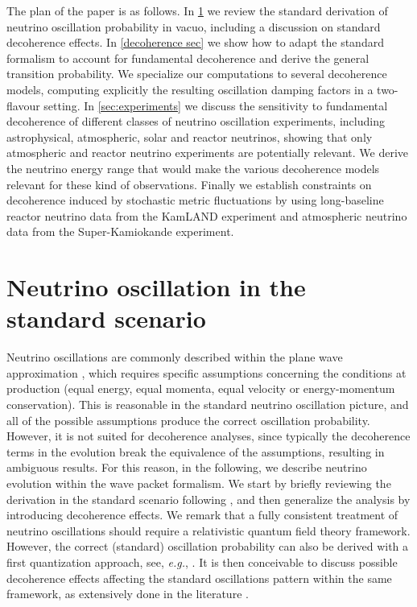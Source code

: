 \documentclass[11pt]{article}
\begin{document}
The plan of the paper is as follows. In \cref{standard oscillations section} we review the standard derivation of neutrino oscillation probability in vacuo, including a discussion on standard decoherence effects. In \cref{decoherence sec} we show how to adapt the standard formalism to account for fundamental decoherence and derive the general transition probability. We specialize our computations to several decoherence models, computing explicitly the resulting oscillation damping factors in a two-flavour setting. In \cref{sec:experiments}
we discuss the sensitivity to fundamental decoherence of different classes of neutrino oscillation experiments, including astrophysical, atmospheric, solar and reactor neutrinos, showing that only atmospheric and reactor neutrino experiments are potentially relevant. We derive the neutrino energy range that would make the various decoherence models relevant for these kind of observations. Finally we establish constraints on decoherence induced by stochastic metric fluctuations by using long-baseline reactor neutrino data from the KamLAND experiment and atmospheric neutrino data from the Super-Kamiokande experiment.




\section{Neutrino oscillation in the standard scenario}\label{standard oscillations section}

Neutrino oscillations are commonly described within the plane wave approximation \cite{Akhmedov:2009rb}, which requires specific assumptions concerning the conditions at production (equal energy, equal momenta, equal velocity or energy-momentum conservation). This is reasonable in the standard neutrino oscillation picture, and all of the possible assumptions produce the correct oscillation probability. However, it is not suited for decoherence analyses, since typically the decoherence terms in the evolution break the equivalence of the assumptions, resulting in ambiguous results. For this reason, in the following, we describe neutrino evolution within the wave packet formalism. We start by briefly reviewing the derivation in the standard scenario following \cite{Akhmedov:2009rb}, and then generalize the analysis by introducing decoherence effects. We remark that a fully consistent treatment of neutrino oscillations should require a relativistic quantum field theory framework. However, the correct (standard) oscillation probability can also be derived with a first quantization approach, see, \emph{e.g.}, \cite{Akhmedov:2009rb}. It is then conceivable to discuss possible decoherence effects affecting the standard oscillations pattern within the same framework, as extensively done in the literature \cite{Christian:2004xb,Banerjee:2022slh,Mavromatos:2007hv,Mavromatos:2004sz,Barenboim:2004wu,Christian:2005qa,Giunti:1997wq,DeRomeri:2023dht,Lisi:2000zt,Adler:2000vfa}.
\end{document}
